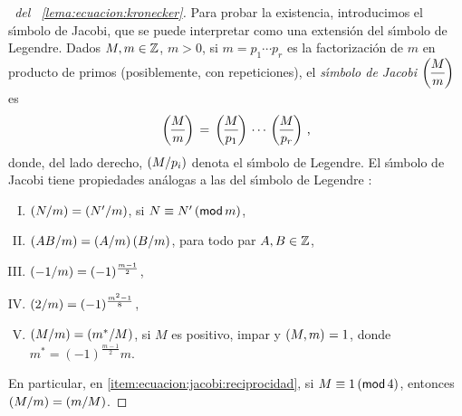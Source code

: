 \begin{proof}[\proofname~del \lemaname~\ref{lema:ecuacion:kronecker}]
	Para probar la existencia, introducimos el s\'{\i}mbolo de Jacobi,
	que se puede interpretar como una extensi\'on del s\'{\i}mbolo de
	Legendre. Dados $M,m\in\Enteros$, $m>0$,
	si $m=p_1\cdots p_r$ es la factorizaci\'on de $m$ en producto de
	primos (posiblemente, con repeticiones), el \emph{s\'{\i}mbolo de %
	Jacobi} $\jacobi M{m}$ es
	\begin{displaymath}
		\jacobi M{m}\,=\,\legendre M{p_1}\,\cdots\,
			\legendre M{p_r}
		\text{ ,}
	\end{displaymath}
	donde, del lado derecho, $\tlegendre M{p_i}$ denota el s\'{\i}mbolo
	de Legendre.
	El s\'{\i}mbolo de Jacobi tiene propiedades an\'alogas
	a las del s\'{\i}mbolo de Legendre %
	\quedacomoejercicio:
	\begin{enumerate}[(I)]
		\item\label{item:ecuacion:jacobi:clases}
			$\tjacobi N{m}=\tjacobi{N'} m$, si
			$N\equiv N'\tmodulo[m]$,
		\item\label{item:ecuacion:jacobi:multiplicativo}
			$\tjacobi{AB} m=\tjacobi A{m}\tjacobi B{m}$,
			para todo par $A,B\in\Enteros$,
		\item\label{item:ecuacion:jacobi:menos-uno}
			$\tjacobi{-1} m=(-1)^{\frac{m-1} 2}$,
		\item\label{item:ecuacion:jacobi:dos}
			$\tjacobi 2{m}=(-1)^{\frac{m^2-1} 8}$,
		\item\label{item:ecuacion:jacobi:reciprocidad}
			$\tjacobi M{m}=\tjacobi{m^*} M$, si $M$ es positivo,
			impar y $\mcd{M,m}=1$, donde
			$m^*=(-1)^{\frac{m-1} 2}m$.
	\end{enumerate}
	En particular, en \eqref{item:ecuacion:jacobi:reciprocidad}, si
	$M\equiv 1\tmodulo[4]$, entonces $\tjacobi M{m}=\tjacobi{m} M$.


\end{proof}
